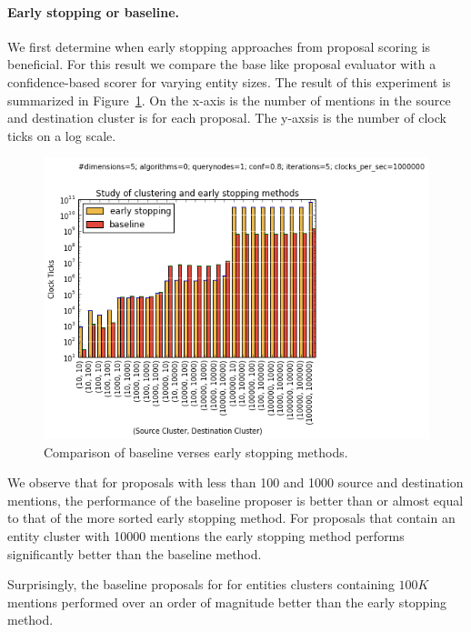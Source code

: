 \paragraph{Early stopping or baseline.}
We first determine when early stopping approaches from proposal scoring is beneficial.
For this result we compare the base like proposal evaluator with a confidence-based scorer for varying entity sizes.
The result of this experiment is summarized in Figure~\ref{fig:clustering-v-early-stopping}.
On the x-axis is the number of mentions in the source and destination cluster is for each proposal. 
The y-axsis is the number of clock ticks on a log scale.

\begin{figure}
\centering
\includegraphics[width=\columnwidth, clip=true,trim=0cm 0cm 4cm 1.2cm]{media/clustering-v-early-stopping.png}
\caption{Comparison of baseline verses early stopping methods.}
\label{fig:clustering-v-early-stopping}
\end{figure}

We observe that for proposals with less than 100 and 1000 source and
destination mentions, the performance of the baseline proposer is better than
or almost equal to that of the more sorted early stopping method.
For proposals that contain an entity cluster with 10000 mentions
the early stopping method performs significantly better than the baseline method.

Surprisingly, the baseline proposals for for entities clusters containing $100 K$ mentions
performed over an order of magnitude better than the early stopping method.

